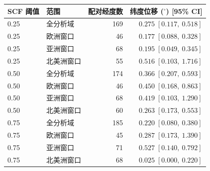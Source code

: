 \begin{tabular}{llrr}
\toprule
SCF 阈值 & 范围 & 配对经度数 & 纬度位移 ($^\circ$) [95\% CI] \\
\midrule
0.25 & 全分析域 & 169 & $0.275\;[0.117,\ 0.518]$ \\
0.25 & 欧洲窗口 & 46 & $0.177\;[0.088,\ 0.328]$ \\
0.25 & 亚洲窗口 & 68 & $0.195\;[0.049,\ 0.345]$ \\
0.25 & 北美洲窗口 & 55 & $0.516\;[0.103,\ 1.716]$ \\
0.50 & 全分析域 & 174 & $0.366\;[0.207,\ 0.593]$ \\
0.50 & 欧洲窗口 & 46 & $0.450\;[0.168,\ 0.863]$ \\
0.50 & 亚洲窗口 & 68 & $0.419\;[0.103,\ 1.290]$ \\
0.50 & 北美洲窗口 & 60 & $0.263\;[0.173,\ 0.553]$ \\
0.75 & 全分析域 & 185 & $0.220\;[0.080,\ 0.380]$ \\
0.75 & 欧洲窗口 & 45 & $0.287\;[0.173,\ 1.390]$ \\
0.75 & 亚洲窗口 & 71 & $0.527\;[0.140,\ 0.792]$ \\
0.75 & 北美洲窗口 & 68 & $0.025\;[0.000,\ 0.220]$ \\
\bottomrule
\end{tabular}
